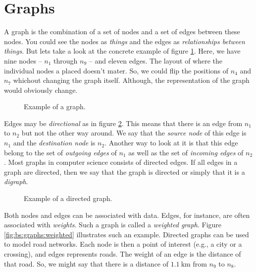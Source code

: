 \section{Graphs}

A graph is the combination of a set of nodes and a set of edges between these nodes. You could see the nodes as \textsl{things} and the edges as \textsl{relationships between things}. But lets take a look at the concrete example of figure \ref{fig:bs:graphs:graph}. Here, we have nine nodes -- $n_1$ through $n_9$ -- and eleven edges. The layout of where the individual nodes a placed doesn't mater. So, we could flip the positions of $n_4$ and $n_7$ whichout changing the graph itself. Although, the representation of the graph would obviously change.

\begin{figure}[tbp]
  
  \caption{Example of a graph.}
  \label{fig:bs:graphs:graph}
\end{figure}

Edges may be \textsl{directional} as in figure \ref{fig:bs:graphs:directed}. This means that there is an edge from $n_1$ to $n_2$ but not the other way around. We say that the \textsl{source node} of this edge is $n_1$ and the \textsl{destination node}  is $n_2$. Another way to look at it is that this edge belong to the set of \textsl{outgoing edges} of $n_1$ as well as the set of \textsl{incoming edges} of $n_2$. Most graphs in computer science consists of directed edges. If all edges in a graph are directed, then we say that the graph is directed or simply that it is a \textsl{digraph}.

\begin{figure}[tbp]
  
  \caption{Example of a directed graph.}
  \label{fig:bs:graphs:directed}
\end{figure}

Both nodes and edges can be associated with data. Edges, for instance, are often associated with \textsl{weights}. Such a graph is called a \textsl{weighted graph}. Figure \ref{fig:bs:graphs:weighted} illustrates such an example. Directed graphs can be used to model road networks. Each node is then a point of interest (e.g., a city or a crossing), and edges represents roads. The weight of an edge is the distance of that road. So, we might say that there is a distance of $1.1~\mathrm{km}$ from $n_9$ to $n_8$.

